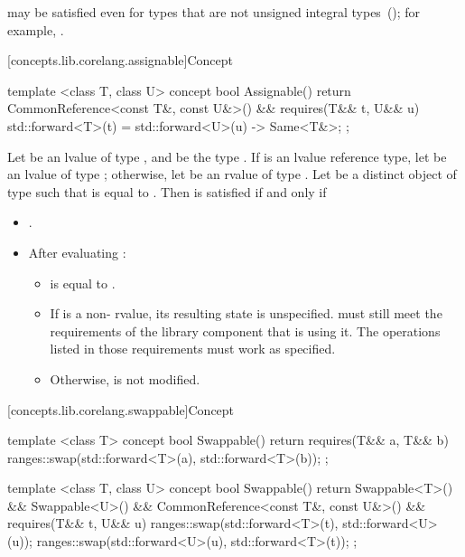 \begin{itemdescr}
\pnum
\enternote {} may be satisfied even for
types that are not unsigned integral types~();
for example, .
\exitnote
\end{itemdescr}

[concepts.lib.corelang.assignable]{Concept }

%
\begin{itemdecl}
template <class T, class U>
concept bool Assignable() {
  return CommonReference<const T&, const U&>() && requires(T&& t, U&& u) {
    { std::forward<T>(t) = std::forward<U>(u) } -> Same<T&>;
  };
}
\end{itemdecl}

\begin{itemdescr}
\pnum
Let  be an lvalue of type , and  be the
type . If  is an lvalue reference
type, let  be an lvalue of type ;
otherwise, let  be an rvalue of type .
Let  be a distinct object of type  such that
 is equal to .
Then  is satisfied if and only if

\begin{itemize}
\item {}.
\item After evaluating :
\begin{itemize}
\item {} is equal to .
\item If  is a non- rvalue, its resulting
state is unspecified. \enternote {} must still meet the requirements
of the library component that is using it. The operations listed in those
requirements must work as specified. \exitnote
\item Otherwise,  is not modified.
\end{itemize}
\end{itemize}
\end{itemdescr}

[concepts.lib.corelang.swappable]{Concept }

%
\begin{itemdecl}
template <class T>
concept bool Swappable() {
  return requires(T&& a, T&& b) {
    ranges::swap(std::forward<T>(a), std::forward<T>(b));
  };
}

template <class T, class U>
concept bool Swappable() {
  return Swappable<T>() &&
    Swappable<U>() &&
    CommonReference<const T&, const U&>() &&
    requires(T&& t, U&& u) {
      ranges::swap(std::forward<T>(t), std::forward<U>(u));
      ranges::swap(std::forward<U>(u), std::forward<T>(t));
    };
}
\end{itemdecl}

